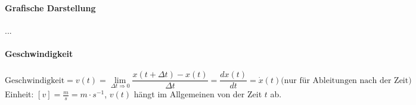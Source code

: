 \documentclass[a4paper,10pt, fleqn]{article}
\begin{document}
\paragraph{Grafische Darstellung}
...

\paragraph{Geschwindigkeit}

\[
  \text{Geschwindigkeit} = v(t) = \lim_{\Delta t \Rightarrow 0} \frac{x(t + \Delta t) - x(t)}{\Delta t}
  = \frac{dx(t)}{dt} = \dot{x}(t) \text{(nur für Ableitungen nach der Zeit)}
\]
Einheit: $[v] = \frac{m}{s} = m\cdot s^{-1}$, $v(t)$ hängt im Allgemeinen von der Zeit $t$ ab.
\end{document}
